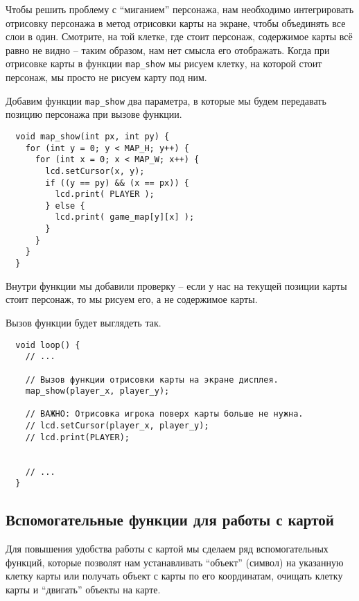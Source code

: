 \documentclass[../sparc.tex]{subfiles}
\begin{document}
Чтобы решить проблему с ``миганием'' персонажа, нам необходимо интегрировать
отрисовку персонажа в метод отрисовки карты на экране, чтобы объединять все слои
в один.  Смотрите, на той клетке, где стоит персонаж, содержимое карты всё равно
не видно -- таким образом, нам нет смысла его отображать.  Когда при отрисовке
карты в функции \texttt{map\_show} мы рисуем клетку, на которой стоит персонаж,
мы просто не рисуем карту под ним.

Добавим функции \texttt{map\_show} два параметра, в которые мы будем передавать
позицию персонажа при вызове функции.

\begin{verbatim}
  void map_show(int px, int py) {
    for (int y = 0; y < MAP_H; y++) {
      for (int x = 0; x < MAP_W; x++) {
        lcd.setCursor(x, y);
        if ((y == py) && (x == px)) {
          lcd.print( PLAYER );
        } else {
          lcd.print( game_map[y][x] );
        }
      }
    }
  }
\end{verbatim}

Внутри функции мы добавили проверку -- если у нас на текущей позиции карты стоит
персонаж, то мы рисуем его, а не содержимое карты.

Вызов функции будет выглядеть так.

\begin{verbatim}
  void loop() {
    // ...

    // Вызов функции отрисовки карты на экране дисплея.
    map_show(player_x, player_y);

    // ВАЖНО: Отрисовка игрока поверх карты больше не нужна.
    // lcd.setCursor(player_x, player_y);
    // lcd.print(PLAYER);


    // ...
  }
\end{verbatim}

\subsection{Вспомогательные функции для работы с картой}
\label{game-dev-game-map:extra-procedures}

Для повышения удобства работы с картой мы сделаем ряд вспомогательных функций,
которые позволят нам устанавливать ``объект'' (символ) на указанную клетку карты
или получать объект с карты по его координатам, очищать клетку карты и
``двигать'' объекты на карте.
\end{document}

